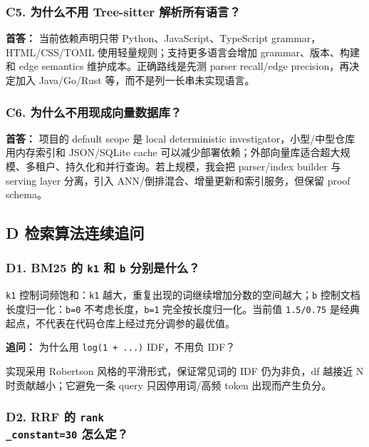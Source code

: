\documentclass[UTF8,12pt,openany]{ctexbook}
\begin{document}
\subsubsection{C5. 为什么不用 Tree-sitter 解析所有语言？}

\textbf{首答：} 当前依赖声明只带 Python、JavaScript、TypeScript grammar，HTML/CSS/TOML 使用轻量规则；支持更多语言会增加 grammar、版本、构建和 edge semantics 维护成本。正确路线是先测 parser recall/edge precision，再决定加入 Java/Go/Rust 等，而不是列一长串未实现语言。\par

\subsubsection{C6. 为什么不用现成向量数据库？}

\textbf{首答：} 项目的 default scope 是 local deterministic investigator，小型/中型仓库用内存索引和 JSON/SQLite cache 可以减少部署依赖；外部向量库适合超大规模、多租户、持久化和并行查询。若上规模，我会把 parser/index builder 与 serving layer 分离，引入 ANN/倒排混合、增量更新和索引服务，但保留 proof schema。\par

\subsection{D 检索算法连续追问}

\subsubsection{D1. BM25 的 \texttt{k1} 和 \texttt{b} 分别是什么？}

\texttt{k1} 控制词频饱和：\texttt{k1} 越大，重复出现的词继续增加分数的空间越大；\texttt{b} 控制文档长度归一化：\texttt{b=0} 不考虑长度，\texttt{b=1} 完全按长度归一化。当前值 \texttt{1.5/0.75} 是经典起点，不代表在代码仓库上经过充分调参的最优值。\par

\textbf{追问：} 为什么用 \texttt{log(1 + ...)} IDF，不用负 IDF？\par

实现采用 Robertson 风格的平滑形式，保证常见词的 IDF 仍为非负，df 越接近 N 时贡献越小；它避免一条 query 只因停用词/高频 token 出现而产生负分。\par

\subsubsection{D2. RRF 的 \texttt{rank\\_constant=30} 怎么定？}
\end{document}
